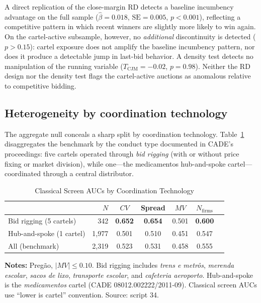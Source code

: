 A direct replication of the \citet{kawai2023using} close-margin RD detects a baseline incumbency advantage on the full sample ($\hat{\beta} = 0.018$, $\text{SE} = 0.005$, $p < 0.001$), reflecting a competitive pattern in which recent winners are slightly more likely to win again. On the cartel-active subsample, however, no \emph{additional} discontinuity is detected ($p > 0.15$): cartel exposure does not amplify the baseline incumbency pattern, nor does it produce a detectable jump in last-bid behavior. A density test detects no manipulation of the running variable ($T_{\text{CJM}} = -0.02$, $p = 0.98$). Neither the RD design nor the density test flags the cartel-active auctions as anomalous relative to competitive bidding.

\subsection{Heterogeneity by coordination technology}\label{sec:coord_type}

The aggregate null conceals a sharp split by coordination technology. Table~\ref{tab:coord_type} disaggregates the benchmark by the conduct type documented in CADE's proceedings: five cartels operated through \emph{bid rigging} (with or without price fixing or market division), while one---the medicamentos hub-and-spoke cartel---coordinated through a central distributor.

\begin{table}[htbp]
\centering
\caption{Classical Screen AUCs by Coordination Technology}\label{tab:coord_type}
\begin{tabular}{lrccccc}
\toprule
& $N$ & $CV$ & Spread & $MV$ & $N_{\text{firms}}$ \\
\midrule
Bid rigging (5 cartels) & 342 & \textbf{0.652} & \textbf{0.654} & 0.501 & \textbf{0.600} \\
Hub-and-spoke (1 cartel) & 1{,}977 & 0.501 & 0.510 & 0.451 & 0.547 \\[3pt]
All (benchmark) & 2{,}319 & 0.523 & 0.531 & 0.458 & 0.555 \\
\bottomrule
\end{tabular}
\vspace{0.5em}
\begin{minipage}{0.90\textwidth}
\scriptsize{\textbf{Notes:} Preg\~{a}o, $\lvert MV \rvert \le 0.10$. Bid rigging includes \emph{trens e metr\^{o}s}, \emph{merenda escolar}, \emph{sacos de lixo}, \emph{transporte escolar}, and \emph{cafeteria aeroporto}. Hub-and-spoke is the \emph{medicamentos} cartel (CADE 08012.002222/2011-09). Classical screen AUCs use ``lower is cartel'' convention. Source: script 34.\par}
\end{minipage}
\end{table}

